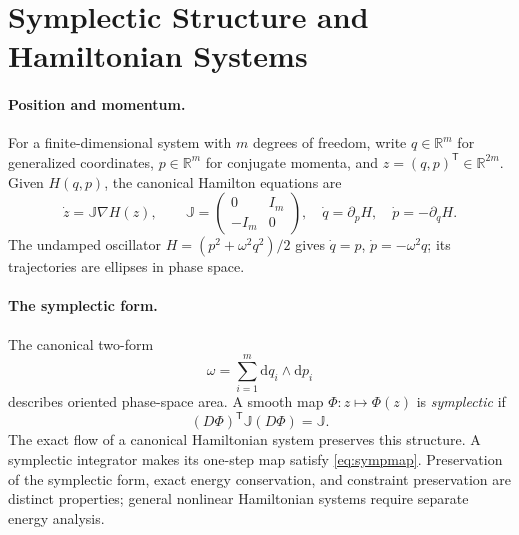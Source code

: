 \documentclass[11pt,openany]{book}
\numberwithin{equation}{chapter}
\theoremstyle{definition}
\theoremstyle{remark}
\newcommand{\dd}{\mathrm d}
\newcommand{\RR}{\mathbb R}
\begin{document}
\section{Symplectic Structure and Hamiltonian Systems}\label{sec:pre-symp}
\paragraph{Position and momentum.}
For a finite-dimensional system with $m$ degrees of freedom, write $q\in\RR^m$ for generalized coordinates, $p\in\RR^m$ for conjugate momenta, and $z=(q,p)^\mathsf T\in\RR^{2m}$. Given $H(q,p)$, the canonical Hamilton equations are
\begin{equation}\label{eq:canonicalham}
\dot z=\mathbb J\nabla H(z),\qquad
\mathbb J=\begin{pmatrix}0&I_m\\-I_m&0\end{pmatrix},
\quad
\dot q=\partial_pH,\quad \dot p=-\partial_qH.
\end{equation}
The undamped oscillator $H=(p^2+\omega^2q^2)/2$ gives $\dot q=p$, $\dot p=-\omega^2q$; its trajectories are ellipses in phase space.

\paragraph{The symplectic form.}
The canonical two-form
\begin{equation}
\omega=\sum_{i=1}^m\dd q_i\wedge\dd p_i
\end{equation}
describes oriented phase-space area. A smooth map $\Phi:z\mapsto\Phi(z)$ is \emph{symplectic} if
\begin{equation}\label{eq:sympmap}
(D\Phi)^\mathsf T\mathbb J(D\Phi)=\mathbb J.
\end{equation}
The exact flow of a canonical Hamiltonian system preserves this structure. A symplectic integrator makes its one-step map satisfy \eqref{eq:sympmap}. Preservation of the symplectic form, exact energy conservation, and constraint preservation are distinct properties; general nonlinear Hamiltonian systems require separate energy analysis.
\end{document}
